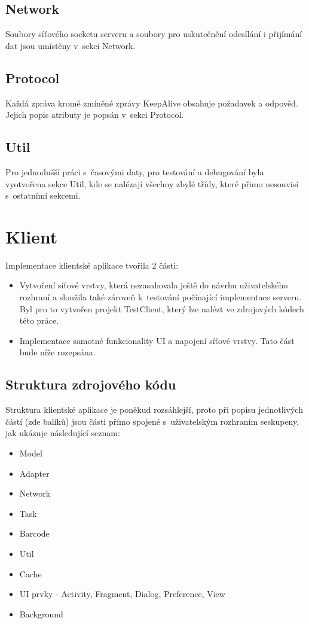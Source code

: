 \documentclass[thesis=B,czech]{FITthesis}[2013/10/20]
\begin{document}
\subsection{Network}
Soubory síťového socketu serveru a soubory pro uskutečnění odesílání i přijímání dat jsou umístěny v~sekci Network. 

\subsection{Protocol}
Každá zpráva kromě zmíněné zprávy KeepAlive obsahuje požadavek a odpověd. Jejich popis atributy je popsán v~sekci Protocol.

\subsection{Util}
Pro jednodušší práci s~časovými daty, pro testování a debugování byla vyotvořena sekce Util, kde se nalézají všechny zbylé třídy, které přimo nesouvisí s~ostatními sekcemi.

\section{Klient}

Implementace klientské aplikace tvořila 2 části:

\begin{itemize}
	\item{Vytvoření síťové vrstvy, která nezasahovala ještě do návrhu uživatelského rozhraní a sloužila také zároveň k~testování počínající implementace serveru. Byl pro to vytvořen projekt TestClient, který lze nalézt ve zdrojových kódech této práce.}
	\item{Implementace samotné funkcionality UI a napojení síťové vrstvy. Tato část bude níže rozepsána.}
\end{itemize}

\subsection{Struktura zdrojového kódu}

Struktura klientské aplikace je poněkud rozsáhlejší, proto při popisu jednotlivých částí (zde balíků) jsou části přímo spojené s~uživatelským rozhraním seskupeny, jak ukázuje následující seznam:

\begin{itemize}
	\item{Model}
	\item{Adapter}
	\item{Network}
	\item{Task}
	\item{Barcode}
	\item{Util}
	\item{Cache}
	\item{UI prvky - Activity, Fragment, Dialog, Preference, View}
	\item{Background}
\end{itemize}
\end{document}
